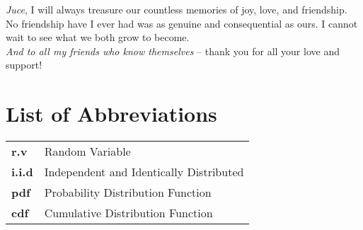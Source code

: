 \documentclass[12pt,twoside]{reedthesis}
\newcommand{\achknowledge}[1]{\noindent \textit{#1},}
\begin{document}
  \achknowledge{Juce} I will always treasure our countless memories of joy, love, and friendship.
   No friendship have I ever had was as genuine and consequential as ours.
   I cannot wait to see what we both grow to become.  \\

 	\noindent \textit{And to all my friends who know themselves} -- thank you for all your love and support!


    \chapter*{List of Abbreviations}

	\begin{table}[h]
	\centering %
	\begin{tabular}{ll}
		\textbf{r.v}  	  &  Random Variable \\
		\textbf{i.i.d}  	&  Independent and Identically Distributed \\
		\textbf{pdf}      &  Probability Distribution Function \\
		\textbf{cdf}      &  Cumulative Distribution Function \\
		\end{tabular}
	\end{table}

    \tableofcontents

    \listoftables \hfill

    \begin{center}

    \Ddisttable \newline

    \hfill \vspace{2em}

    \spectrumschemetable \newline

    \hfill \vspace{2em}

    \dispersiontable \newline

    \hfill \vspace{2em}

    \pairingschemetable \newline

    \end{center}
\end{document}
